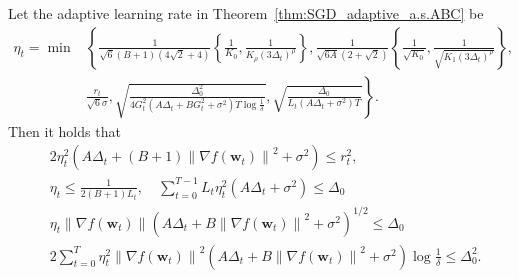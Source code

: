 \documentclass[10pt,a4paper]{amsart}
\newcommand{\Kr}{K_{\rho}}
\newcommand{\Norm}[1]{\left\|#1\right\|}
\newcommand{\bw}{\mathbf{w}}
\newcommand{\paren}[1]{\left( #1 \right)}
\begin{document}
\begin{lemma}\label{lem:sgd_stepsize_adaptive_ABC}
    Let the adaptive learning rate in Theorem~\ref{thm:SGD_adaptive_a.s.ABC} be 
    \begin{align*}
        \eta_t=\min&\left\{
        \frac{1}{\sqrt{6}(B+1)(4\sqrt{2}+4)}\left\{\frac{1}{K_0}, \frac{1}{\Kr\paren{3\Delta_t}^\rho}\right\},
        \frac{1}{\sqrt{6A}(2+\sqrt{2})}\left\{\frac{1}{\sqrt{K_0}}, \frac{1}{\sqrt{K_1 \paren{3\Delta_t}^\rho}}\right\},\right.\\
        &\left.\frac{r_t}{\sqrt{6}\sigma},\sqrt{\frac{\Delta_0^2}{4G_t^2\paren{A\Delta_t+BG_t^2+\sigma^2}T\log\frac{1}{\delta}}},
        \sqrt{\frac{\Delta_0}{L_t\paren{A\Delta_t+\sigma^2}T}}
        \right\}.
    \end{align*}
    Then it holds that 
    \begin{align*}
        &2\eta_t^2\paren{A\Delta_t+(B+1)\Norm{\nabla f(\bw_t)}^2+\sigma^2}\leq r_t^2,\\
        &\eta_t\leq\frac{1}{2(B+1)L_t},\quad\sum_{t=0}^{T-1}L_t\eta_t^2 \paren{A\Delta_t+\sigma^2}\leq\Delta_0\\
        &\eta_t\Norm{\nabla f(\bw_t)}\paren{A\Delta_t+B\Norm{\nabla f(\bw_t)}^2+\sigma^2}^{1/2}\leq\Delta_0\\
        &2\sum_{t=0}^T\eta_t^2\Norm{\nabla f(\bw_t)}^2\paren{A\Delta_t+B\Norm{
    \nabla f(\bw_t)}^2+\sigma^2}\log\frac{1}{\delta}\leq\Delta_0^2.
    \end{align*}
\end{lemma}
\end{document}
